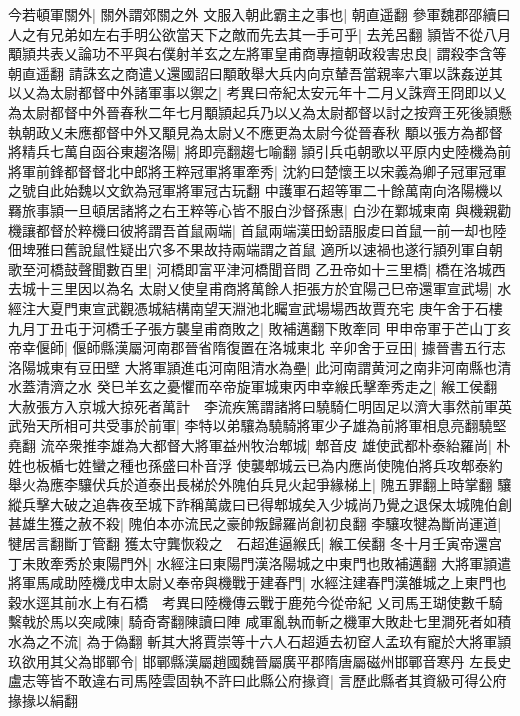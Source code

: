今若頓軍關外|{
	關外謂郊關之外}
文服入朝此霸主之事也|{
	朝直遥翻}
參軍魏郡邵續曰人之有兄弟如左右手明公欲當天下之敵而先去其一手可乎|{
	去羌呂翻}
頴皆不從八月顒頴共表乂論功不平與右僕射羊玄之左將軍皇甫商專擅朝政殺害忠良|{
	謂殺李含等朝直遥翻}
請誅玄之商遣乂還國詔曰顒敢舉大兵内向京輦吾當親率六軍以誅姦逆其以乂為太尉都督中外諸軍事以禦之|{
	考異曰帝紀太安元年十二月乂誅齊王冏即以乂為太尉都督中外晉春秋二年七月顒頴起兵乃以乂為太尉都督以討之按齊王死後頴懸執朝政乂未應都督中外又顒見為太尉乂不應更為太尉今從晉春秋}
顒以張方為都督將精兵七萬自函谷東趨洛陽|{
	將即亮翻趨七喻翻}
頴引兵屯朝歌以平原内史陸機為前將軍前鋒都督督北中郎將王粹冠軍將軍牽秀|{
	沈約曰楚懷王以宋義為卿子冠軍冠軍之號自此始魏以文欽為冠軍將軍冠古玩翻}
中護軍石超等軍二十餘萬南向洛陽機以羇旅事頴一旦頓居諸將之右王粹等心皆不服白沙督孫惠|{
	白沙在鄴城東南}
與機親勸機讓都督於粹機曰彼將謂吾首鼠兩端|{
	首鼠兩端漢田蚡語服䖍曰首鼠一前一却也陸佃埤雅曰舊說鼠性疑出穴多不果故持兩端謂之首鼠}
適所以速禍也遂行頴列軍自朝歌至河橋鼓聲聞數百里|{
	河橋即富平津河橋聞音問}
乙丑帝如十三里橋|{
	橋在洛城西去城十三里因以為名}
太尉乂使皇甫商將萬餘人拒張方於宜陽己巳帝還軍宣武場|{
	水經注大夏門東宣武觀憑城結構南望天淵池北矚宣武場場西故賈充宅}
庚午舍于石樓九月丁丑屯于河橋壬子張方襲皇甫商敗之|{
	敗補邁翻下敗牽同}
甲申帝軍于芒山丁亥帝幸偃師|{
	偃師縣漢屬河南郡晉省隋復置在洛城東北}
辛卯舍于豆田|{
	據晉書五行志洛陽城東有豆田壁}
大將軍頴進屯河南阻清水為壘|{
	此河南謂黄河之南非河南縣也清水蓋清濟之水}
癸巳羊玄之憂懼而卒帝旋軍城東丙申幸緱氏擊牽秀走之|{
	緱工侯翻}
大赦張方入京城大掠死者萬計　李流疾篤謂諸將曰驍騎仁明固足以濟大事然前軍英武殆天所相可共受事於前軍|{
	李特以弟驤為驍騎將軍少子雄為前將軍相息亮翻驍堅堯翻}
流卒衆推李雄為大都督大將軍益州牧治郫城|{
	郫音皮}
雄使武都朴泰紿羅尚|{
	朴姓也板楯七姓蠻之種也孫盛曰朴音浮}
使襲郫城云已為内應尚使隗伯將兵攻郫泰約舉火為應李驤伏兵於道泰出長梯於外隗伯兵見火起爭緣梯上|{
	隗五罪翻上時掌翻}
驤縱兵擊大破之追犇夜至城下詐稱萬歲曰已得郫城矣入少城尚乃覺之退保太城隗伯創甚雄生獲之赦不殺|{
	隗伯本亦流民之豪帥叛歸羅尚創初良翻}
李驤攻犍為斷尚運道|{
	犍居言翻斷丁管翻}
獲太守龔恢殺之　石超進逼緱氏|{
	緱工侯翻}
冬十月壬寅帝還宫丁未敗牽秀於東陽門外|{
	水經注曰東陽門漢洛陽城之中東門也敗補邁翻}
大將軍頴遣將軍馬咸助陸機戊申太尉乂奉帝與機戰于建春門|{
	水經注建春門漢雒城之上東門也穀水逕其前水上有石橋　考異曰陸機傳云戰于鹿苑今從帝紀}
乂司馬王瑚使數千騎繫戟於馬以突咸陳|{
	騎奇寄翻陳讀曰陣}
咸軍亂執而斬之機軍大敗赴七里澗死者如積水為之不流|{
	為于偽翻}
斬其大將賈崇等十六人石超遁去初䆠人孟玖有寵於大將軍頴玖欲用其父為邯鄲令|{
	邯鄲縣漢屬趙國魏晉屬廣平郡隋唐屬磁州邯鄲音寒丹}
左長史盧志等皆不敢違右司馬陸雲固執不許曰此縣公府掾資|{
	言歷此縣者其資級可得公府掾掾以絹翻}
